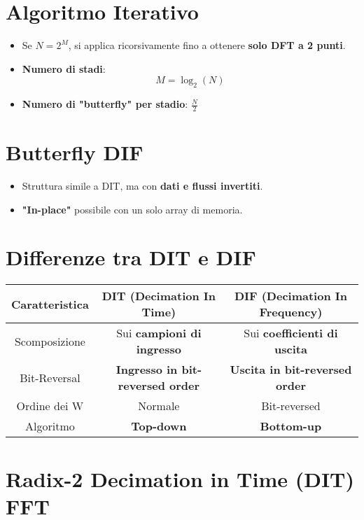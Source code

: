 \section*{Algoritmo Iterativo}

\begin{itemize}
    \item Se \( N = 2^M \), si applica ricorsivamente fino a ottenere \textbf{solo DFT a 2 punti}.
    \item \textbf{Numero di stadi}: 
    \[
    M = \log_2 (N)
    \]
    \item \textbf{Numero di "butterfly" per stadio}: \( \frac{N}{2} \)
\end{itemize}

\section*{Butterfly DIF}

\begin{itemize}
    \item Struttura simile a DIT, ma con \textbf{dati e flussi invertiti}.
    \item \textbf{"In-place"} possibile con un solo array di memoria.
\end{itemize}
\section*{Differenze tra DIT e DIF}

\begin{center}
\begin{tabular}{|c|c|c|}
\hline
\textbf{Caratteristica} & \textbf{DIT (Decimation In Time)} & \textbf{DIF (Decimation In Frequency)} \\
\hline
Scomposizione & Sui \textbf{campioni di ingresso} & Sui \textbf{coefficienti di uscita} \\
\hline
Bit-Reversal & \textbf{Ingresso in bit-reversed order} & \textbf{Uscita in bit-reversed order} \\
\hline
Ordine dei W & Normale & Bit-reversed \\
\hline
Algoritmo & \textbf{Top-down} & \textbf{Bottom-up} \\
\hline
\end{tabular}
\end{center}

\section*{Radix-2 Decimation in Time (DIT) FFT}

